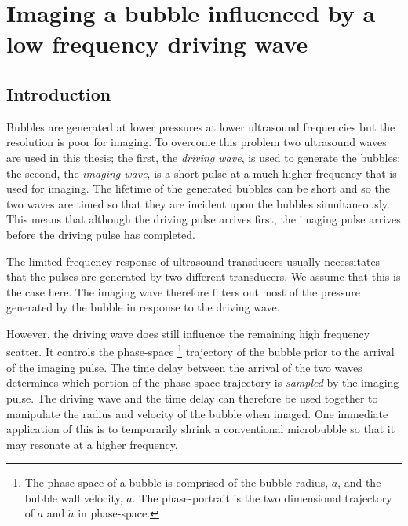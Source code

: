 \chapter{Imaging a bubble influenced by a low frequency driving wave}\label{ch:mechanisms}




\section{Introduction}

Bubbles are generated at lower pressures at lower ultrasound frequencies\cite{Willard1953}
but the resolution is poor for imaging.
To overcome this problem two ultrasound waves are used in this thesis;
the first, the {\em driving wave}, is used to generate the bubbles; 
the second, the  {\em imaging wave}, is a short pulse at a much higher frequency that is used for imaging.
The  lifetime of the generated bubbles can be short
and so the two waves are timed so that they are incident upon the bubbles simultaneously.
This means that although the driving pulse arrives first,
the imaging pulse arrives before the driving pulse has completed.

The limited frequency response of ultrasound transducers usually necessitates that the pulses
are generated by two different transducers.
We assume that this is the case here.
The imaging wave therefore filters out most of the pressure generated by the bubble in response to the driving wave.

However, the driving wave does still influence the remaining high frequency scatter.
It controls the phase-space%
\footnote{
  The phase-space of a bubble is comprised of the bubble radius, $a$, and the bubble wall velocity, $\dot a$.
  The phase-portrait is the two dimensional trajectory of  $a$ and $\dot a$ in phase-space.
}
trajectory of the bubble prior to the arrival of the imaging pulse.
The time  delay between the arrival of the two waves determines 
which portion of the phase-space trajectory is {\em sampled} by the imaging pulse.
The driving wave and the time delay can therefore be used together to manipulate the  radius and velocity
of the bubble when imaged. 
One immediate application of this is to temporarily shrink a conventional microbubble  so that it
may resonate at a higher frequency.

